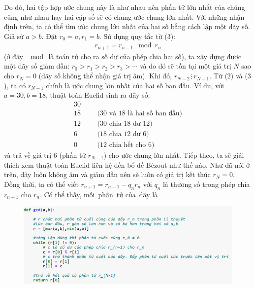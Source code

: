 \begin{multicols}{2}
	\vskip 0.1cm
	Do đó, hai tập hợp ước chung này là như nhau nên phần tử lớn nhất của chúng cũng như nhau hay hai cặp số sẽ có chung ước chung lớn nhất.
	\vskip 0.1cm
	Với những nhận định trên, ta có thể tìm ước chung lớn nhất của hai số bằng cách lập một dãy số. Giả sử $a>b$. Đặt $r_0=a,r_1=b$. Sử dụng quy tắc từ ($3$):
	\begin{align*}
		r_{n+1}=r_{n-1}  \mod r_n
	\end{align*}
	(ở đây $\mod$ là toán tử cho ra số dư của phép chia hai số), ta xây dựng được một dãy số giảm dần: $r_0>r_1>r_2>r_3>\cdots$ và do đó sẽ tồn tại một giá trị $N$ sao cho $r_N=0$ (dãy số không thể nhận giá trị âm). Khi đó, $r_{N-2}\,\vdots\,r_{N-1}$. Từ ($2$) và ($3$), ta có $r_{N-1}$ chính là ước chung lớn nhất của hai số ban đầu.
	\vskip 0.1cm
	Ví dụ, với $a=30,b=18$, thuật toán Euclid sinh ra dãy số:
	\begin{align*}
		30&	&&\\
		18&	&&\text{($30$ và $18$ là hai số ban đầu)}\\	
		12&	&&\text{($30$ chia $18$ dư $12$)}\\
		6&	&&\text{($18$ chia $12$ dư $6$)}\\
		0&	&&\text{($12$ chia hết cho $6$)}
	\end{align*}
	và trả về giá trị $6$ (phần tử $r_{N-1}$) cho ước chung lớn nhất.
	\vskip 0.1cm
	Tiếp theo, ta sẽ giải thích xem thuật toán Euclid liên hệ đến bổ đề Bézout như thế nào. Như đã nói ở trên, dãy luôn không âm và giảm dần nên sẽ luôn có giá trị kết thúc $r_N=0$. Đồng thời, ta có thể viết $r_{n+1}=r_{n-1}-q_n r_n$ với $q_n$ là thương số trong phép chia $r_{n-1}$ cho $r_n$. Có thể thấy, mỗi \,phần \,tử của \,dãy là
	\end{multicols}
	\begin{figure}[H]
		\centering
		\vspace*{5pt}
		\captionsetup{labelformat= empty, justification=centering}
		\includegraphics[width=1\linewidth]{2}
		\vspace*{-15pt}
	\end{figure}
